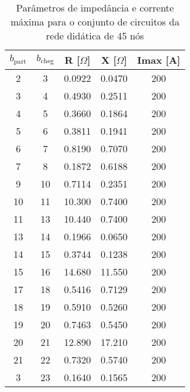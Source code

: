 \begin{table}[H]\tiny
    \caption{Parâmetros de impedância e corrente máxima para o conjunto de circuitos da rede didática de 45 nós}
    \label{tab:imp}
    \begin{minipage}{.5\linewidth}
        \centering
        \begin{tabular}{|c|c|c|c|c|}
        \hline
        $b_\text{part}$ & $b_\text{cheg}$& R [$\Omega$]  & X [$\Omega$] & Imax [A]\\ \hline
         2 &  3 & 0.0922 & 0.0470 & 200\\ \hline
         3 &  4 & 0.4930 & 0.2511 & 200\\ \hline
         4 &  5 & 0.3660 & 0.1864 & 200\\ \hline
         5 &  6 & 0.3811 & 0.1941 & 200\\ \hline
         6 &  7 & 0.8190 & 0.7070 & 200\\ \hline
         7 &  8 & 0.1872 & 0.6188 & 200\\ \hline
         9 & 10 & 0.7114 & 0.2351 & 200\\ \hline
        10 & 11 & 10.300 & 0.7400 & 200\\ \hline
        11 & 13 & 10.440 & 0.7400 & 200\\ \hline
        13 & 14 & 0.1966 & 0.0650 & 200\\ \hline
        14 & 15 & 0.3744 & 0.1238 & 200\\ \hline
        15 & 16 & 14.680 & 11.550 & 200\\ \hline
        17 & 18 & 0.5416 & 0.7129 & 200\\ \hline
        18 & 19 & 0.5910 & 0.5260 & 200\\ \hline
        19 & 20 & 0.7463 & 0.5450 & 200\\ \hline
        20 & 21 & 12.890 & 17.210 & 200\\ \hline
        21 & 22 & 0.7320 & 0.5740 & 200\\ \hline
         3 & 23 & 0.1640 & 0.1565 & 200\\ \hline        
        \end{tabular}
        

\end{minipage}
\end{table}
